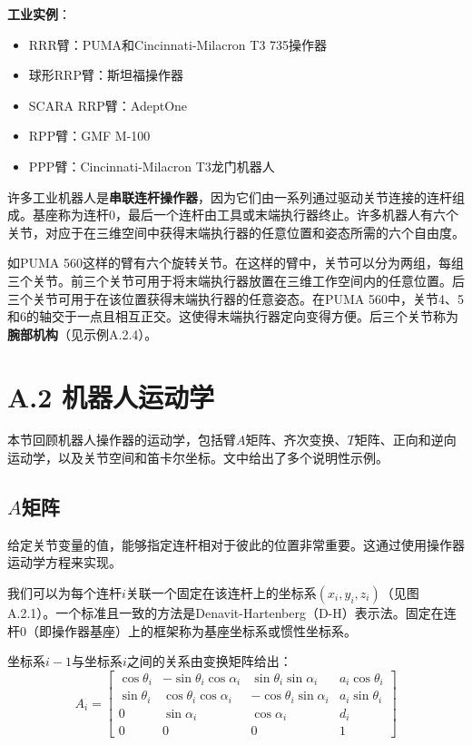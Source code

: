 \documentclass[UTF8,a4paper]{ctexart}
\begin{document}
\textbf{工业实例}：
\begin{itemize}
    \item RRR臂：PUMA和Cincinnati-Milacron T3 735操作器
    \item 球形RRP臂：斯坦福操作器
    \item SCARA RRP臂：AdeptOne
    \item RPP臂：GMF M-100
    \item PPP臂：Cincinnati-Milacron T3龙门机器人
\end{itemize}

许多工业机器人是\textbf{串联连杆操作器}，因为它们由一系列通过驱动关节连接的连杆组成。基座称为连杆0，最后一个连杆由工具或末端执行器终止。许多机器人有六个关节，对应于在三维空间中获得末端执行器的任意位置和姿态所需的六个自由度。

如PUMA 560这样的臂有六个旋转关节。在这样的臂中，关节可以分为两组，每组三个关节。前三个关节可用于将末端执行器放置在三维工作空间内的任意位置。后三个关节可用于在该位置获得末端执行器的任意姿态。在PUMA 560中，关节4、5和6的轴交于一点且相互正交。这使得末端执行器定向变得方便。后三个关节称为\textbf{腕部机构}（见示例A.2.4）。

\section{A.2 机器人运动学}

本节回顾机器人操作器的运动学，包括臂$A$矩阵、齐次变换、$T$矩阵、正向和逆向运动学，以及关节空间和笛卡尔坐标。文中给出了多个说明性示例。

\subsection{$A$矩阵}

给定关节变量的值，能够指定连杆相对于彼此的位置非常重要。这通过使用操作器运动学方程来实现。

我们可以为每个连杆$i$关联一个固定在该连杆上的坐标系$(x_i, y_i, z_i)$（见图A.2.1）。一个标准且一致的方法是Denavit-Hartenberg（D-H）表示法。固定在连杆0（即操作器基座）上的框架称为基座坐标系或惯性坐标系。

坐标系$i-1$与坐标系$i$之间的关系由变换矩阵给出：
\begin{equation}
A_i = \begin{bmatrix}
\cos\theta_i & -\sin\theta_i\cos\alpha_i & \sin\theta_i\sin\alpha_i & a_i\cos\theta_i \\
\sin\theta_i & \cos\theta_i\cos\alpha_i & -\cos\theta_i\sin\alpha_i & a_i\sin\theta_i \\
0 & \sin\alpha_i & \cos\alpha_i & d_i \\
0 & 0 & 0 & 1
\end{bmatrix}
\tag{A.2.1}
\end{equation}
\end{document}
